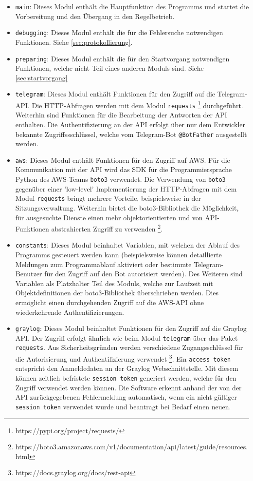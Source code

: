 \begin{itemize}
\item \lstinline{main}: Dieses Modul enthält die Hauptfunktion des Programms und startet die Vorbereitung und den Übergang in den Regelbetrieb.
\item \lstinline{debugging}: Dieses Modul enthält die für die Fehlersuche notwendigen Funktionen. Siehe \autoref{sec:protokollierung}.
\item \lstinline{preparing}: Dieses Modul enthält die für den Startvorgang notwendigen Funktionen, welche nicht Teil eines anderen Moduls sind. Siehe \autoref{sec:startvorgang}
\item \lstinline{telegram}: Dieses Modul enthält Funktionen für den Zugriff auf die Telegram-API. Die HTTP-Abfragen werden mit dem Modul \lstinline{requests} \footnote{https://pypi.org/project/requests/} durchgeführt. Weiterhin sind Funktionen für die Bearbeitung der Antworten der API enthalten. Die Authentifizierung an der API erfolgt über nur dem Entwickler bekannte Zugriffssschlüssel, welche vom Telegram-Bot \lstinline{@BotFather} ausgestellt werden.
\item \lstinline{aws}: Dieses Modul enthält Funktionen für den Zugriff auf AWS. Für die Kommunikation mit der API wird das SDK für die Programmiersprache Python des AWS-Teams \lstinline{boto3} verwendet. Die Verwendung von \lstinline{boto3} gegenüber einer 'low-level' Implementierung der HTTP-Abfragen mit dem Modul \lstinline{requests} bringt mehrere Vorteile, beispielsweise in der Sitzungsverwaltung. Weiterhin bietet die boto3-Bibliothek die Möglichkeit, für ausgesuchte Dienste einen mehr objektorientierten und von API-Funktionen abstrahierten Zugriff zu verwenden \footnote{https://boto3.amazonaws.com/v1/documentation/api/latest/guide/resources.html}.
\item \lstinline{constants}: Dieses Modul beinhaltet Variablen, mit welchen der Ablauf des Programms gesteuert werden kann (beispielsweise können detaillierte Meldungen zum Programmablauf aktiviert oder bestimmte Telegram-Benutzer für den Zugriff auf den Bot autorisiert werden). Des Weiteren sind Variablen als Platzhalter Teil des Moduls, welche zur Laufzeit mit Objektdefinitionen der boto3-Bibliothek überschrieben werden. Dies ermöglicht einen durchgehenden Zugriff auf die AWS-API ohne wiederkehrende Authentifizierungen.
\item \lstinline{graylog}: Dieses Modul beinhaltet Funktionen für den Zugriff auf die Graylog API. Der Zugriff erfolgt ähnlich wie beim Modul \lstinline{telegram} über das Paket \lstinline{requests}. Aus Sicherheitsgründen werden verschiedene Zugangsschlüssel für die Autorisierung und Authentifizierung verwendet \footnote{https://docs.graylog.org/docs/rest-api}. Ein \lstinline{access token} entspricht den Anmeldedaten an der Graylog Webschnittstelle. Mit diesem können zeitlich befristete \lstinline{session token} generiert werden, welche für den Zugriff verwendet werden können. Die Software erkennt anhand der von der API zurückgegebenen Fehlermeldung automatisch, wenn ein nicht gültiger \lstinline{session token} verwendet wurde und beantragt bei Bedarf einen neuen.

\end{itemize}
